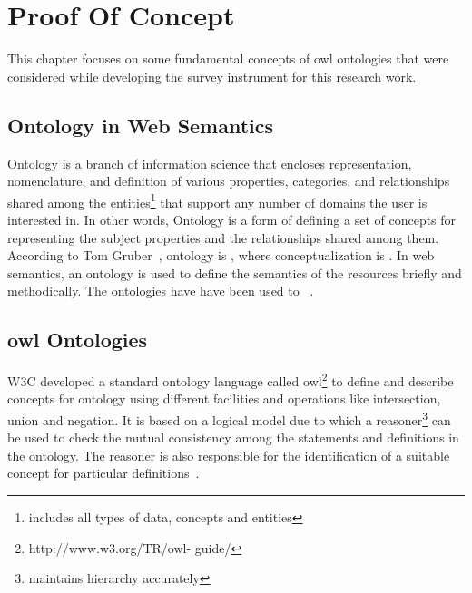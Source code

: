 \chapter{Proof Of Concept}
\label{chap:proofOfConcept}
\begin{doublespace}
\par This chapter focuses on some fundamental concepts of \ac{owl} ontologies that were considered while developing the survey instrument for this research work. 
\section{Ontology in Web Semantics}
\par Ontology is a branch of information science that encloses representation, nomenclature, and definition of various properties, categories, and relationships shared among the entities\footnote{includes all types of data, concepts and entities} that support any number of domains the user is interested in. In other words, Ontology is a form of defining a set of concepts for representing the subject properties and the relationships shared among them. According to Tom Gruber~\cite{gruber1995towards}, ontology is , where conceptualization is . In web semantics, an ontology is used to define the semantics of the resources briefly and methodically. The ontologies have have been used to ~\cite{jacob2003ontologies}.
\section{\ac{owl} Ontologies}
\par W3C developed a standard ontology language called \ac{owl}\footnote{ http://www.w3.org/TR/owl- guide/} to define and describe concepts for ontology using different facilities and operations like intersection, union and negation. It is based on a logical model due to which a reasoner\footnote{maintains hierarchy accurately} can be used to check the mutual consistency among the statements and definitions in the ontology. The reasoner is also responsible for the identification of a suitable concept for particular definitions~\cite{horridge2009practical}.

\end{doublespace}
